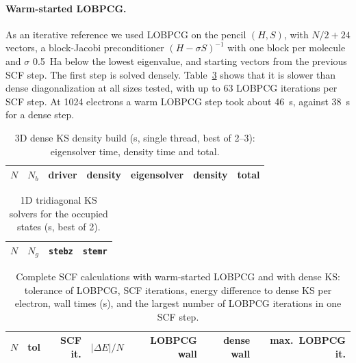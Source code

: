 \documentclass[aps,prb,onecolumn,superscriptaddress,floatfix]{revtex4-2}
\begin{document}
\paragraph*{Warm-started LOBPCG.} As an iterative reference we used LOBPCG on the pencil $(H,S)$, with $N/2+24$ vectors, a
block-Jacobi preconditioner $(H-\sigma S)^{-1}$ with one block per molecule and $\sigma$ 0.5~Ha below the lowest eigenvalue,
and starting vectors from the previous SCF step. The first step is solved densely. Table~\ref{tab:lobpcg} shows that it is
slower than dense diagonalization at all sizes tested, with up to 63 LOBPCG iterations per SCF step. At 1024 electrons a warm
LOBPCG step took about 46~s, against 38~s for a dense step.

\begin{table}[h]
\caption{\label{tab:ksdrivers}3D dense KS density build (s, single thread, best of 2--3): eigensolver time, density time and
total.}
\begin{ruledtabular}
\begin{tabular}{rrllrrr}
$N$ & $N_b$ & driver & density & eigensolver & density & total \\
\hline

\end{tabular}
\end{ruledtabular}
\end{table}

\begin{table}[h]
\caption{\label{tab:ks1d}1D tridiagonal KS solvers for the occupied states (s, best of 2).}
\begin{ruledtabular}
\begin{tabular}{rrrr}
$N$ & $N_g$ & \texttt{stebz} & \texttt{stemr} \\
\hline

\end{tabular}
\end{ruledtabular}
\end{table}

\begin{table}[h]
\caption{\label{tab:lobpcg}Complete SCF calculations with warm-started LOBPCG and with dense KS: tolerance of LOBPCG, SCF
iterations, energy difference to dense KS per electron, wall times (s), and the largest number of LOBPCG iterations in one
SCF step.}
\begin{ruledtabular}
\begin{tabular}{rrrrrrr}
$N$ & tol & SCF it. & $|\Delta E|/N$ & LOBPCG wall & dense wall & max.\ LOBPCG it. \\
\hline

\end{tabular}
\end{ruledtabular}
\end{table}
\end{document}
